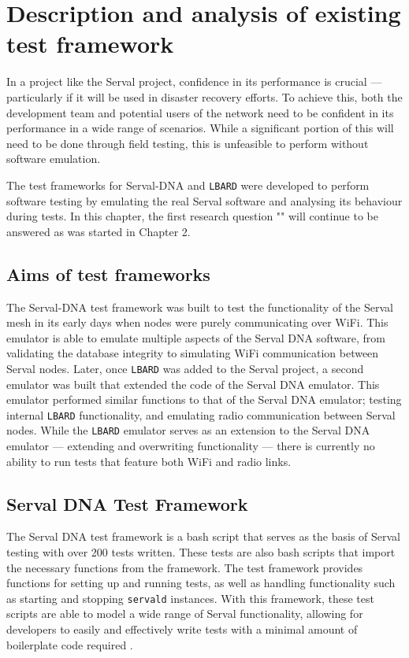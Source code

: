 \chapter{Description and analysis of existing test framework} 
\label{Chapter3} 

In a project like the Serval project, confidence in its performance is crucial — particularly if it will be used in disaster recovery efforts.
To achieve this, both the development team and potential users of the network need to be confident in its performance in a wide range of scenarios. 
While a significant portion of this will need to be done through field testing, this is unfeasible to perform without software emulation.

The test frameworks for Serval-DNA and \texttt{LBARD} were developed to perform software testing by emulating the real Serval software and analysing its behaviour during tests.
In this chapter, the first research question "\firstRQ" will continue to be answered as was started in Chapter 2. 


\section{Aims of test frameworks}
The Serval-DNA test framework was built to test the functionality of the Serval mesh in its early days when nodes were purely communicating over WiFi. 
This emulator is able to emulate multiple aspects of the Serval DNA software, from validating the database integrity to simulating WiFi communication between Serval nodes. 
Later, once \texttt{LBARD} was added to the Serval project, a second emulator was built that extended the code of the Serval DNA emulator.
This emulator performed similar functions to that of the Serval DNA emulator; testing internal \texttt{LBARD} functionality, and emulating radio communication between Serval nodes. 
While the \texttt{LBARD} emulator serves as an extension to the Serval DNA emulator — extending and overwriting functionality — there is currently no ability to run tests that feature both WiFi and radio links. 


\section{Serval DNA Test Framework}
The Serval DNA test framework is a bash script that serves as the basis of Serval testing with over 200 tests written.
These tests are also bash scripts that import the necessary functions from the framework. 
The test framework provides functions for setting up and running tests, as well as handling functionality such as starting and stopping \texttt{servald} instances.
With this framework, these test scripts are able to model a wide range of Serval functionality, allowing for developers to easily and effectively write tests with a minimal amount of boilerplate code required \parencite{servalTestDocumentation}.

